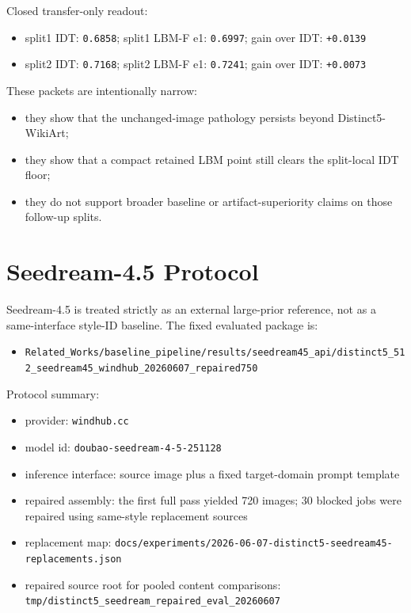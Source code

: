 \documentclass[letterpaper]{article}
\begin{document}
Closed transfer-only readout:
\begin{itemize}
\item split1 IDT: \texttt{0.6858}; split1 LBM-F e1: \texttt{0.6997}; gain over IDT: \texttt{+0.0139}
\item split2 IDT: \texttt{0.7168}; split2 LBM-F e1: \texttt{0.7241}; gain over IDT: \texttt{+0.0073}
\end{itemize}

These packets are intentionally narrow:
\begin{itemize}
\item they show that the unchanged-image pathology persists beyond Distinct5-WikiArt;
\item they show that a compact retained LBM point still clears the split-local IDT floor;
\item they do not support broader baseline or artifact-superiority claims on those follow-up splits.
\end{itemize}

\section{Seedream-4.5 Protocol}
Seedream-4.5 is treated strictly as an external large-prior reference, not as a same-interface style-ID baseline. The fixed evaluated package is:
\begin{itemize}
\item \texttt{Related\_Works/baseline\_pipeline/results/seedream45\_api/distinct5\_512\_seedream45\_windhub\_20260607\_repaired750}
\end{itemize}

Protocol summary:
\begin{itemize}
\item provider: \texttt{windhub.cc}
\item model id: \texttt{doubao-seedream-4-5-251128}
\item inference interface: source image plus a fixed target-domain prompt template
\item repaired assembly: the first full pass yielded 720 images; 30 blocked jobs were repaired using same-style replacement sources
\item replacement map: \texttt{docs/experiments/2026-06-07-distinct5-seedream45-replacements.json}
\item repaired source root for pooled content comparisons: \texttt{tmp/distinct5\_seedream\_repaired\_eval\_20260607}
\end{itemize}
\end{document}
